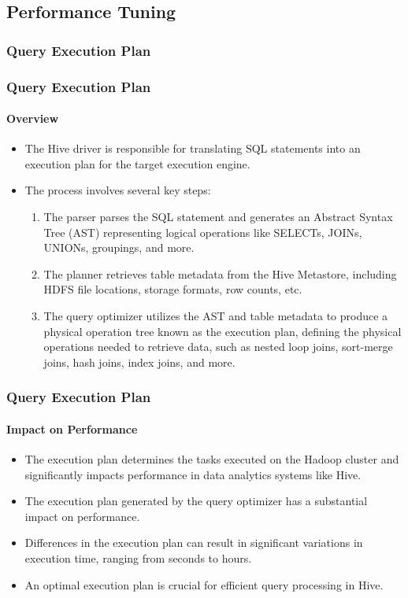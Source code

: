 
\subsection{Performance Tuning}
\subsubsection{Query Execution Plan}
\begin{frame}
	\frametitle{Query Execution Plan}
	\framesubtitle{Overview}
	
	\begin{itemize}
	  \item The Hive driver is responsible for translating SQL statements into an execution plan for the target execution engine.
	  \item The process involves several key steps:
		\begin{enumerate}
		  \item The parser parses the SQL statement and generates an Abstract Syntax Tree (AST) representing logical operations like SELECTs, JOINs, UNIONs, groupings, and more.
		  \item The planner retrieves table metadata from the Hive Metastore, including HDFS file locations, storage formats, row counts, etc.
		  \item The query optimizer utilizes the AST and table metadata to produce a physical operation tree known as the execution plan, defining the physical operations needed to retrieve data, such as nested loop joins, sort-merge joins, hash joins, index joins, and more.
		\end{enumerate}

	\end{itemize}
	
	\end{frame}
	
	\begin{frame}
	\frametitle{Query Execution Plan}
	\framesubtitle{Impact on Performance}
	
	\begin{itemize}
	\item The execution plan determines the tasks executed on the Hadoop cluster and significantly impacts performance in data analytics systems like Hive.
	  \item The execution plan generated by the query optimizer has a substantial impact on performance.
	  \item Differences in the execution plan can result in significant variations in execution time, ranging from seconds to hours.
	  \item An optimal execution plan is crucial for efficient query processing in Hive.
	\end{itemize}
	
	\end{frame}
	
